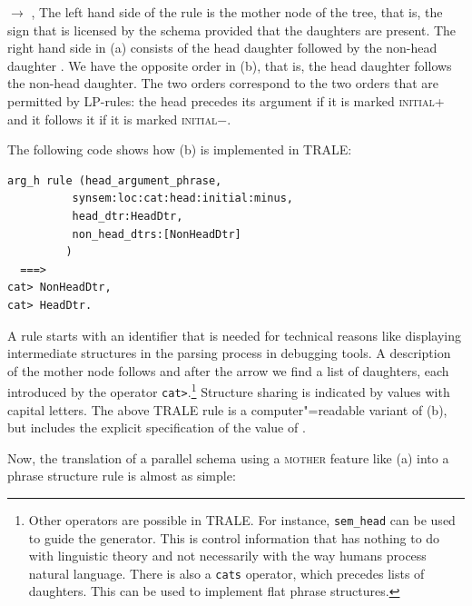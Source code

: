 \ex {} $\to$ , 
\zl
The left hand side of the rule is the mother node of the tree, that is, the sign that is licensed by
the schema provided that the daughters are present. The right hand side in (a) consists of
the head daughter  followed by the non-head daughter . We have the opposite order
in (b), that is, the head daughter follows the non-head daughter. The two orders correspond
to the two orders that are permitted by LP-rules: the head precedes its argument if it is marked
\textsc{initial}+ and it follows it if it is marked \textsc{initial}$-$.

The following code shows how (b) is implemented in TRALE:
\begin{verbatim}
arg_h rule (head_argument_phrase,
          synsem:loc:cat:head:initial:minus,
          head_dtr:HeadDtr,
          non_head_dtrs:[NonHeadDtr]
         )
  ===>
cat> NonHeadDtr,
cat> HeadDtr.
\end{verbatim}
A rule starts with an identifier that is needed for technical reasons like displaying intermediate
structures in the parsing process in debugging tools. A description of the mother node follows and
after the arrow we find a list of daughters, each introduced by the operator \verb+cat>+.\footnote{
  Other operators are possible in TRALE. For instance, \texttt{sem\_head} can be used to guide the
  generator. This is control information that has nothing to do with linguistic theory and not
  necessarily with the way humans process natural language. There is also a \texttt{cats} operator,
  which precedes lists of daughters. This can be used to implement flat phrase structures.%
}
Structure sharing is indicated by values with capital letters. The above TRALE rule is a
computer"=readable variant of (b), but includes the explicit specification of the value of {\initial}.  

Now, the translation of a parallel schema using a \textsc{mother} feature like (a) into a phrase structure rule is almost as simple:
\eal
\ex {}

